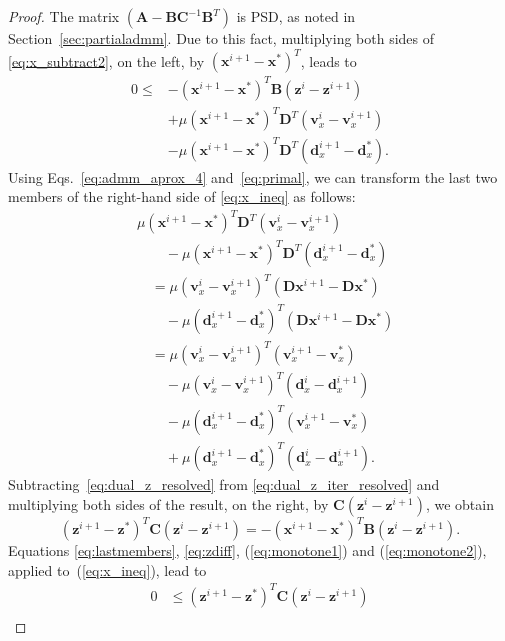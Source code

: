 \documentclass[10pt,twocolumn,twoside]{IEEEtran}
\newcommand{\x}{\mathbf{x}} %
\newcommand{\z}{\mathbf{z}} %
\newcommand{\vs}{\mathbf{v}} %
\newcommand{\dv}{\mathbf{d}} %
\newcommand{\D}{\mathbf{D}} %
\newcommand{\A}{\mathbf{A}} %
\newcommand{\B}{\mathbf{B}} %
\newcommand{\C}{\mathbf{C}} %
\begin{document}
\begin{proof}
	The matrix $( \A - \B \C^{-1} \B^T )$ is PSD, as noted in Section~\ref{sec:partialadmm}. Due to this fact, multiplying both sides of \eqref{eq:x_subtract2}, on the left, by $(\x^{i+1} - \x^*)^T$, leads to
	\begin{equation} \label{eq:x_ineq}
	\begin{aligned}
	0 \leq &-(\x^{i+1} - \x^*)^T \B (\z^i - \z^{i+1}) \\
	& + \mu (\x^{i+1} - \x^*)^T \D^T (\vs_x^i - \vs_x^{i+1})\\
	& - \mu (\x^{i+1} - \x^*)^T \D^T (\dv_x^{i+1} - \dv_x^*).
	\end{aligned}
	\end{equation}
	Using Eqs.~\eqref{eq:admm_aprox_4} and~\eqref{eq:primal}, we can transform the last two members of the right-hand side of \eqref{eq:x_ineq} as follows:
	\begin{equation} \label{eq:lastmembers}
	\begin{aligned}
	&\mu (\x^{i+1} - \x^*)^T \D^T (\vs_x^i - \vs_x^{i+1}) \\
	& \qquad - \mu (\x^{i+1} - \x^*)^T \D^T (\dv_x^{i+1} - \dv_x^*) \\
	& \quad = \mu (\vs_x^i - \vs_x^{i+1})^T (\D\x^{i+1} - \D\x^*)\\
	& \qquad - \mu (\dv_x^{i+1} - \dv_x^*)^T (\D\x^{i+1} - \D\x^*) \\
	& \quad = \mu (\vs_x^i - \vs_x^{i+1})^T (\vs_x^{i+1} - \vs_x^*) \\
	& \qquad - \mu (\vs_x^i - \vs_x^{i+1})^T (\dv_x^i - \dv_x^{i+1}) \\
	& \qquad- \mu (\dv_x^{i+1} - \dv_x^*)^T (\vs_x^{i+1} - \vs_x^*) \\
	& \qquad + \mu (\dv_x^{i+1} - \dv_x^*)^T (\dv_x^i - \dv_x^{i+1}).
	\end{aligned}
	\end{equation}
	Subtracting~\eqref{eq:dual_z_resolved} from \eqref{eq:dual_z_iter_resolved} and multiplying both sides of the result, on the right, by $\C (\z^i - \z^{i+1})$, we obtain
	\begin{equation} \label{eq:zdiff}
	(\z^{i+1} - \z^*)^T \C (\z^i - \z^{i+1}) = -(\x^{i+1} - \x^*)^T \B (\z^i - \z^{i+1}).
	\end{equation}
	Equations \eqref{eq:lastmembers}, \eqref{eq:zdiff}, (\ref{eq:monotone1}) and (\ref{eq:monotone2}), applied to~(\ref{eq:x_ineq}), lead to
	\begin{equation} \label{eq:x_ineq2}
	\begin{aligned}
	0 & \leq (\z^{i+1} - \z^*)^T \C (\z^i - \z^{i+1}) \\

\end{aligned}
\end{equation}
\end{proof}
\end{document}

